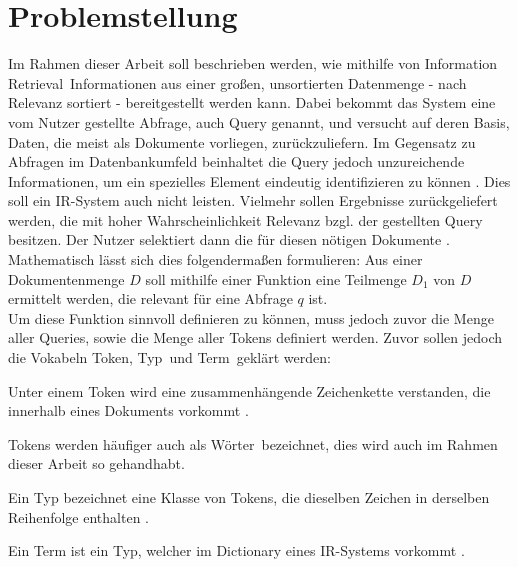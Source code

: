 \section{Problemstellung}
Im Rahmen dieser Arbeit soll beschrieben werden, wie mithilfe von \glqq Information Retrieval\grqq\ Informationen aus einer großen, unsortierten Datenmenge - nach Relevanz sortiert - bereitgestellt werden kann. Dabei bekommt das System eine vom Nutzer gestellte Abfrage, auch Query genannt, und versucht auf deren Basis, Daten, die meist als Dokumente vorliegen, zurückzuliefern. Im Gegensatz zu Abfragen im Datenbankumfeld beinhaltet die Query jedoch unzureichende Informationen, um ein spezielles Element eindeutig identifizieren zu können \cite[S. 1 f.]{IR_Intro_Cambridge}. Dies soll ein IR-System auch nicht leisten. Vielmehr sollen Ergebnisse zurückgeliefert werden, die mit hoher Wahrscheinlichkeit Relevanz bzgl. der gestellten Query besitzen. Der Nutzer selektiert dann die für diesen nötigen Dokumente \cite[S. 1 f.]{IR_Intro_Cambridge}.
\\
Mathematisch lässt sich dies folgendermaßen formulieren: Aus einer Dokumentenmenge $D$ soll mithilfe einer Funktion eine Teilmenge $D_1$ von $D$ ermittelt werden, die relevant für eine Abfrage $q$ ist.
\\
Um diese Funktion sinnvoll definieren zu können, muss jedoch zuvor die Menge aller Queries, sowie die Menge aller Tokens definiert werden. Zuvor sollen jedoch die Vokabeln \glqq Token\grqq, \glqq Typ\grqq\ und \glqq Term\grqq\ geklärt werden:

\begin{defi}[Token]\label{def:Token}
	Unter einem Token wird eine zusammenhängende Zeichenkette verstanden, die innerhalb eines Dokuments vorkommt \cite[S. 22]{IR_Intro_Cambridge}.
\end{defi}

Tokens werden häufiger auch als \glqq Wörter\grqq\ bezeichnet, dies wird auch im Rahmen dieser Arbeit so gehandhabt.

\begin{defi}[Typ]\label{def:Typ}
	Ein Typ bezeichnet eine Klasse von Tokens, die dieselben Zeichen in derselben Reihenfolge enthalten \cite[S. 22]{IR_Intro_Cambridge}.
\end{defi}
\begin{defi}[Term]\label{def:Term}
	Ein Term ist ein Typ, welcher im Dictionary eines IR-Systems vorkommt \cite[S. 22]{IR_Intro_Cambridge}.
\end{defi}

